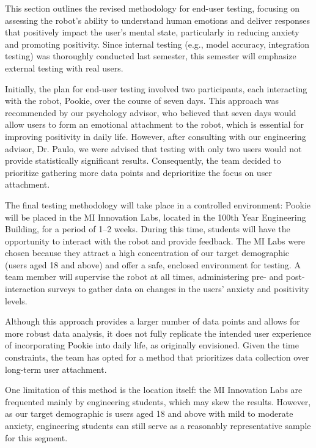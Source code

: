This section outlines the revised methodology for end-user testing, focusing on assessing the robot's ability to understand human emotions and deliver responses that positively impact the user’s mental state, particularly in reducing anxiety and promoting positivity. Since internal testing (e.g., model accuracy, integration testing) was thoroughly conducted last semester, this semester will emphasize external testing with real users.

Initially, the plan for end-user testing involved two participants, each interacting with the robot, Pookie, over the course of seven days. This approach was recommended by our psychology advisor, who believed that seven days would allow users to form an emotional attachment to the robot, which is essential for improving positivity in daily life. However, after consulting with our engineering advisor, Dr. Paulo, we were advised that testing with only two users would not provide statistically significant results. Consequently, the team decided to prioritize gathering more data points and deprioritize the focus on user attachment.

The final testing methodology will take place in a controlled environment: Pookie will be placed in the MI Innovation Labs, located in the 100th Year Engineering Building, for a period of 1–2 weeks. During this time, students will have the opportunity to interact with the robot and provide feedback. The MI Labs were chosen because they attract a high concentration of our target demographic (users aged 18 and above) and offer a safe, enclosed environment for testing. A team member will supervise the robot at all times, administering pre- and post-interaction surveys to gather data on changes in the users’ anxiety and positivity levels.

Although this approach provides a larger number of data points and allows for more robust data analysis, it does not fully replicate the intended user experience of incorporating Pookie into daily life, as originally envisioned. Given the time constraints, the team has opted for a method that prioritizes data collection over long-term user attachment.

One limitation of this method is the location itself: the MI Innovation Labs are frequented mainly by engineering students, which may skew the results. However, as our target demographic is users aged 18 and above with mild to moderate anxiety, engineering students can still serve as a reasonably representative sample for this segment.

